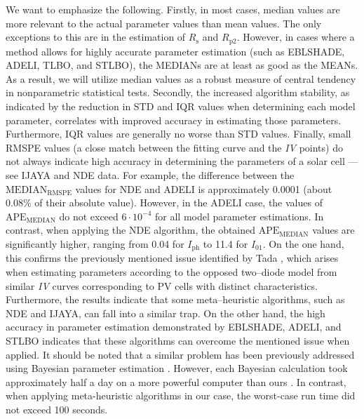 \documentclass[a4paper,fleqn]{cas-sc}
\begin{document}
We want to emphasize the following. 
Firstly, in most cases, median values are more relevant to the actual parameter values than mean values. 
The only exceptions to this are in the estimation of $R_\mathrm{s}$ and $R_\mathrm{p2}$. 
However, in cases where a method allows for highly accurate parameter estimation (such as EBLSHADE, ADELI, TLBO, and STLBO), 
the MEDIANs are at least as good as the MEANs.
As a result, we will utilize median values as a robust measure of central tendency in nonparametric statistical tests.
Secondly, the increased algorithm stability, as indicated by the reduction in STD and IQR values 
when determining each model parameter, correlates with improved accuracy in estimating those parameters.
Furthermore, IQR values are generally no worse than STD values. 
Finally, small RMSPE values (a close match between the fitting curve and the \emph{IV} points) 
do not always indicate high accuracy in determining the parameters of a solar cell --- see IJAYA and NDE data.
For example, the difference between the $\mathrm{MEDIAN}_\mathrm{RMSPE}$ values for NDE and ADELI is approximately 0.0001 
(about 0.08\% of their absolute value). 
However, in the ADELI case, the values of $\mathrm{APE}_\mathrm{MEDIAN}$ do not exceed $6\cdot 10^{-4}$ 
for all model parameter estimations. 
In contrast, when applying the NDE algorithm, the obtained $\mathrm{APE}_\mathrm{MEDIAN}$ values are significantly higher, 
ranging from 0.04 for $I_\mathrm{ph}$ to 11.4 for $I_{01}$.
On the one hand, this confirms the previously mentioned issue identified by Tada \cite{Tada2015Organic,Tada2021}, 
which arises when estimating parameters according to the opposed two--diode model from similar \emph{IV} curves 
corresponding to PV cells with distinct characteristics. 
Furthermore, the results indicate that some meta--heuristic algorithms, such as NDE and IJAYA, can fall into a similar trap. 
On the other hand, the high accuracy in parameter estimation demonstrated by EBLSHADE, ADELI, and STLBO indicates 
that these algorithms can overcome the mentioned issue when applied.
It should be noted that a similar problem has been previously addressed using Bayesian parameter estimation \cite{Tada2021}.  
However, each Bayesian calculation took approximately half a day on a more powerful computer than ours \cite{Tada2021}.  
In contrast, when applying meta-heuristic algorithms in our case, the worst-case run time did not exceed 100 seconds.
\end{document}
